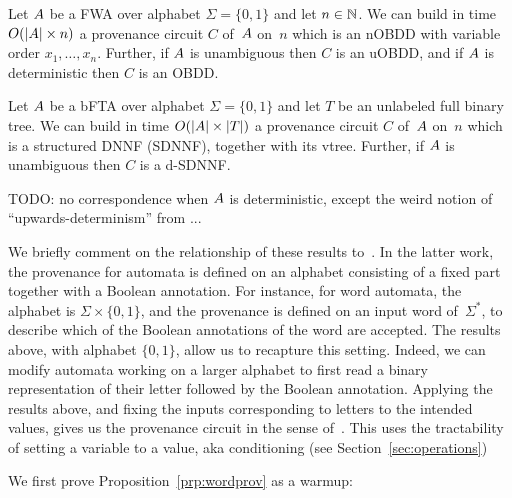 \begin{proposition}
  \label{prp:wordprov}
  Let $A$ be a FWA over alphabet $\Sigma = \{0, 1\}$ and let $n \in \mathbb{N}$. We
  can build in time $O(|A| \times n)$ a provenance circuit $C$ of~$A$ on~$n$
  which is an nOBDD with variable order $x_1, \ldots, x_n$.
  Further, if $A$ is unambiguous then $C$ is an uOBDD, and if $A$ is
  deterministic then $C$ is an OBDD.
\end{proposition}

\begin{proposition}
  \label{prp:treeprov}
  Let $A$ be a bFTA over alphabet $\Sigma = \{0, 1\}$ and let $T$ be an
  unlabeled full binary tree. We
  can build in time $O(|A| \times |T|)$ a provenance circuit $C$ of~$A$ on~$n$
  which is a structured DNNF (SDNNF), together with its vtree.
  Further, if $A$ is unambiguous then $C$ is a d-SDNNF.
\end{proposition}

TODO: no correspondence when $A$ is deterministic, except the weird notion of
``upwards-determinism'' from \cite{amarilli2017circuit}...

We briefly comment on the relationship of these results
to~\cite{amarilli2015provenance}. In the latter work, the provenance for
automata is defined on an alphabet consisting of a fixed part together with a
Boolean annotation. For instance, for word automata, the alphabet is $\Sigma
\times \{0, 1\}$, and the provenance is defined on an input word of~$\Sigma^*$,
to describe which of the Boolean annotations of the word are accepted. The
results above, with alphabet $\{0, 1\}$, allow us to recapture this setting.
Indeed, we can modify automata working on a larger alphabet to first read a
binary representation of their letter followed by the Boolean annotation.
Applying the results above, and fixing the inputs corresponding to letters to
the intended values, gives us the provenance circuit in the sense
of~\cite{amarilli2015provenance}. This uses the tractability of setting a
variable to a value, aka conditioning (see Section~\ref{sec:operations})

We first prove Proposition~\ref{prp:wordprov} as a warmup:

